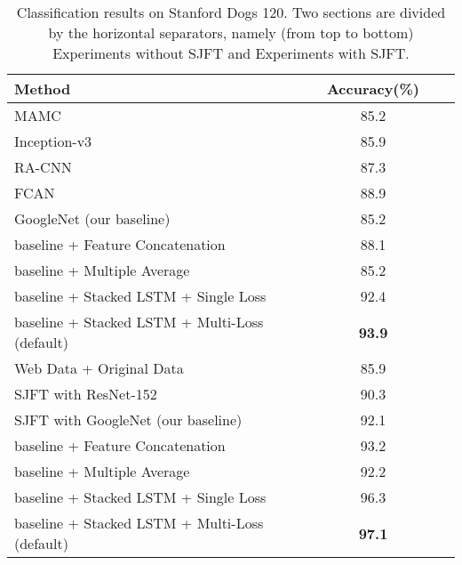 \documentclass[10pt,twocolumn,letterpaper]{article}
\begin{document}
\begin{table}[t]\small
\setlength{\abovecaptionskip}{10pt}
\setlength{\belowcaptionskip}{-10pt}
\begin{center}
\begin{tabular}{@{}lccc@{}}
\toprule
Method                                             & Accuracy(\%)       \\ \midrule
MAMC \cite{sun18}                                  & 85.2               \\
Inception-v3 \cite{krause2015unreasonable}         & 85.9               \\
RA-CNN \cite{jianf17}                              & 87.3               \\
FCAN \cite{Liu16FCAN}                              & 88.9               \\
GoogleNet (our baseline)                               & 85.2               \\
baseline + Feature Concatenation                   & 88.1               \\
baseline + Multiple Average                        & 85.2               \\
baseline + Stacked LSTM + Single Loss              & 92.4               \\
baseline + Stacked LSTM + Multi-Loss (default)     & \textbf{93.9}      \\\midrule
Web Data + Original Data \cite{krause2015unreasonable} & 85.9             \\
SJFT with ResNet-152 \cite{GeYu17}                 & 90.3               \\
SJFT with GoogleNet (our baseline)                     & 92.1               \\
baseline + Feature Concatenation                   & 93.2               \\
baseline + Multiple Average                        & 92.2               \\
baseline + Stacked LSTM + Single Loss             & 96.3               \\
baseline + Stacked LSTM + Multi-Loss (default)    & \textbf{97.1}      \\
\bottomrule
\end{tabular}
\end{center}
\caption{Classification results on Stanford Dogs 120. Two sections are divided by the horizontal separators, namely (from top to bottom) Experiments without SJFT and Experiments with SJFT.}
\label{tab:StanfordDogs120}
\end{table}
\end{document}
